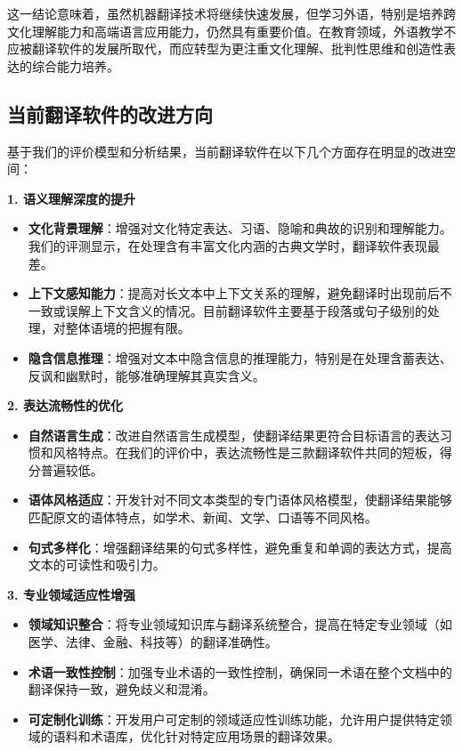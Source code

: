 \documentclass[bwprint]{cumcmthesis}
\begin{document}
这一结论意味着，虽然机器翻译技术将继续快速发展，但学习外语，特别是培养跨文化理解能力和高端语言应用能力，仍然具有重要价值。在教育领域，外语教学不应被翻译软件的发展所取代，而应转型为更注重文化理解、批判性思维和创造性表达的综合能力培养。

\subsection{当前翻译软件的改进方向}
基于我们的评价模型和分析结果，当前翻译软件在以下几个方面存在明显的改进空间：

\textbf{1. 语义理解深度的提升}

\begin{itemize}
    \item \textbf{文化背景理解}：增强对文化特定表达、习语、隐喻和典故的识别和理解能力。我们的评测显示，在处理含有丰富文化内涵的古典文学时，翻译软件表现最差。
    
    \item \textbf{上下文感知能力}：提高对长文本中上下文关系的理解，避免翻译时出现前后不一致或误解上下文含义的情况。目前翻译软件主要基于段落或句子级别的处理，对整体语境的把握有限。
    
    \item \textbf{隐含信息推理}：增强对文本中隐含信息的推理能力，特别是在处理含蓄表达、反讽和幽默时，能够准确理解其真实含义。
\end{itemize}

\textbf{2. 表达流畅性的优化}

\begin{itemize}
    \item \textbf{自然语言生成}：改进自然语言生成模型，使翻译结果更符合目标语言的表达习惯和风格特点。在我们的评价中，表达流畅性是三款翻译软件共同的短板，得分普遍较低。
    
    \item \textbf{语体风格适应}：开发针对不同文本类型的专门语体风格模型，使翻译结果能够匹配原文的语体特点，如学术、新闻、文学、口语等不同风格。
    
    \item \textbf{句式多样化}：增强翻译结果的句式多样性，避免重复和单调的表达方式，提高文本的可读性和吸引力。
\end{itemize}

\textbf{3. 专业领域适应性增强}

\begin{itemize}
    \item \textbf{领域知识整合}：将专业领域知识库与翻译系统整合，提高在特定专业领域（如医学、法律、金融、科技等）的翻译准确性。
    
    \item \textbf{术语一致性控制}：加强专业术语的一致性控制，确保同一术语在整个文档中的翻译保持一致，避免歧义和混淆。
    
    \item \textbf{可定制化训练}：开发用户可定制的领域适应性训练功能，允许用户提供特定领域的语料和术语库，优化针对特定应用场景的翻译效果。
\end{itemize}
\end{document}

